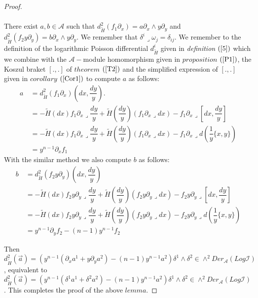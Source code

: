 \documentclass[a4paper, 12pt,oneside,reqno]{amsart}
\theoremstyle{definition}
\begin{document}
\begin{proof}
\begin{enumerate}
\begin{align*}
 \end{align*} There exist $a,b\in \mathcal{A}$ such that $ d_{\tilde{H}}^{2}(f_{1}\partial_{x})=a \partial_{x}\wedge y \partial_{y}  $ and $ d_{\tilde{H}}^{2}(f_{2}y\partial_{y}) =  b \partial_{x}\wedge y\partial_{y}$.
We remember that $\delta^{i}\lrcorner \omega_{j}=\delta_{ij}$. We remember to the definition of the logarithmic Poisson differential $d^{i}_{\tilde{H}}$ given in \textit{definition} $(\ref{5})$ which we combine with the $\mathcal{A}-$module homomorphism given in $proposition$ $(\ref{P1})$, the Koszul braket $[.,.]$ of $theorem$ $(\ref{T2})$ and the simplified expression of $[.,.]$ given in $corollary$ $ (\ref{Cor1}) $
 to compute  $a$  as follows:
 \begin{align*}
 a &\ = d_{\tilde{H}}^{2}(f_{1}\partial_{x}) ( dx ,\dfrac{dy}{y} ).\\
  &\ =-\tilde{H}(dx)f_{1}\partial_{x}\lrcorner\dfrac{dy}{y}+\tilde{H}(\dfrac{dy}{y})(f_{1}\partial_{x}\lrcorner dx) -f_{1} \partial_{x}\lrcorner [dx, \dfrac{dy}{y}]\\
 &\ =-\tilde{H}(dx)f_{1}\partial_{x}\lrcorner\dfrac{dy}{y}+\tilde{H}(\dfrac{dy}{y})(f_{1}\partial_{x}\lrcorner dx) -f_{1} \partial_{x}\lrcorner d(\dfrac{1}{y}\{x,y\})\\
 &\ = y^{n-1}\partial_{x}f_{1}
 \end{align*}
 With the similar method we also compute $b$ as follows:
 \begin{align*}
 b &\ = d_{\tilde{H}}^{2}(f_{2}y\partial_{y}) ( dx ,\dfrac{dy}{y} )\\
  &\ =-\tilde{H}(dx)f_{2}y\partial_{y}\lrcorner\dfrac{dy}{y}+\tilde{H}(\dfrac{dy}{y})(f_{2}y\partial_{y}\lrcorner dx) -f_{2} y\partial_{y}\lrcorner [dx, \dfrac{dy}{y}]\\
 &\ =-\tilde{H}(dx)f_{2}y\partial_{y}\lrcorner\dfrac{dy}{y}+\tilde{H}(\dfrac{dy}{y})(f_{2}y\partial_{y}\lrcorner dx) -f_{2} y\partial_{y}\lrcorner d(\dfrac{1}{y}\{x,y\})\\
 &\ = y^{n-1}\partial_{y}f_{2}-(n-1)y^{n-1}f_{2}
 \end{align*}
 \end{enumerate}
 Then 
  $ d_{\tilde{H}}^{2}(\overrightarrow{a}) = \left( y^{n-1} (\partial_{x}a^{1} + y\partial_{y}a^{2}) -(n-1)y^{n-1}a^{2}\right)\delta^{1}\wedge \delta^{2}\in \wedge^{2}Der_{\mathcal{A} }(Log \mathcal{I})$, equivalent to   $ d_{\tilde{H}}^{2}(\overrightarrow{a}) = \left( y^{n-1} (\delta^{1}a^{1} + \delta^{2}a^{2}) -(n-1)y^{n-1}a^{2}\right)\delta^{1}\wedge \delta^{2}\in \wedge^{2}Der_{\mathcal{A} }(Log \mathcal{I})$.
 This completes the proof of the above $lemma$.
\end{proof}
\end{document}
